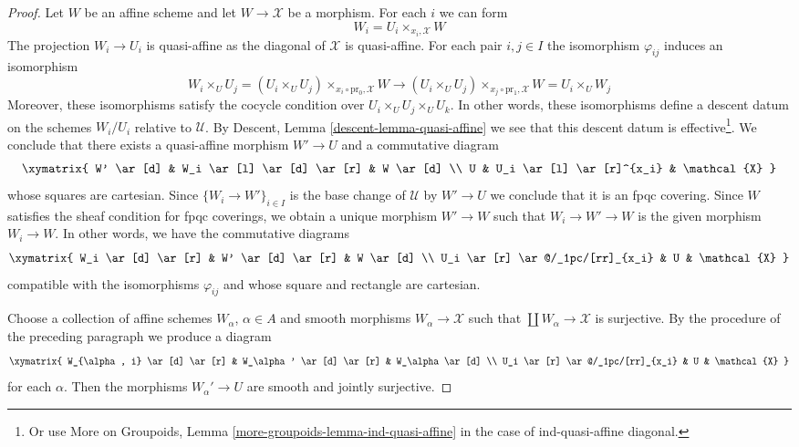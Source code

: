 \begin{proof}
\medskip\noindent
Let $W$ be an affine scheme and let $W \to \mathcal{X}$
be a morphism. For each $i$ we can form
$$
W_i = U_i \times_{x_i, \mathcal{X}} W
$$
The projection $W_i \to U_i$ is quasi-affine as the
diagonal of $\mathcal{X}$ is quasi-affine. For each pair
$i, j \in I$ the isomorphism $\varphi_{ij}$ induces
an isomorphism
$$
W_i \times_U U_j =
(U_i \times_U U_j) \times_{x_i \circ \text{pr}_0, \mathcal{X}} W
\to
(U_i \times_U U_j) \times_{x_j \circ \text{pr}_1, \mathcal{X}} W =
U_i \times_U W_j
$$
Moreover, these isomorphisms satisfy the cocycle condition over
$U_i \times_U U_j \times_U U_k$. In other words, these isomorphisms
define a descent datum on the schemes $W_i/U_i$ relative to $\mathcal{U}$.
By Descent, Lemma \ref{descent-lemma-quasi-affine}
we see that this descent datum is effective\footnote{Or use
More on Groupoids, Lemma \ref{more-groupoids-lemma-ind-quasi-affine}
in the case of ind-quasi-affine diagonal.}.
We conclude that there exists a quasi-affine morphism
$W' \to U$ and a commutative diagram
$$
\xymatrix{
W' \ar[d] &
W_i \ar[l] \ar[d] \ar[r] &
W \ar[d] \\
U &
U_i \ar[l] \ar[r]^{x_i} &
\mathcal{X}
}
$$
whose squares are cartesian. Since $\{W_i \to W'\}_{i \in I}$
is the base change of $\mathcal{U}$ by $W' \to U$ we conclude
that it is an fpqc covering. Since $W$ satisfies the sheaf
condition for fpqc coverings, we obtain a unique morphism
$W' \to W$ such that $W_i \to W' \to W$ is the given morphism
$W_i \to W$. In other words, we have the commutative diagrams
$$
\xymatrix{
W_i \ar[d] \ar[r] &
W' \ar[d] \ar[r] &
W \ar[d] \\
U_i \ar[r] \ar@/_1pc/[rr]_{x_i} &
U &
\mathcal{X}
}
$$
compatible with the isomorphisms $\varphi_{ij}$ and whose
square and rectangle are cartesian.

\medskip\noindent
Choose a collection of affine schemes $W_\alpha$, $\alpha \in A$
and smooth morphisms $W_\alpha \to \mathcal{X}$ such that
$\coprod W_\alpha \to \mathcal{X}$ is surjective.
By the procedure of the preceding paragraph we produce
a diagram
$$
\xymatrix{
W_{\alpha, i} \ar[d] \ar[r] &
W_\alpha' \ar[d] \ar[r] &
W_\alpha \ar[d] \\
U_i \ar[r] \ar@/_1pc/[rr]_{x_i} &
U &
\mathcal{X}
}
$$
for each $\alpha$. Then the morphisms $W_\alpha' \to U$ are
smooth and jointly surjective.


\end{proof}
